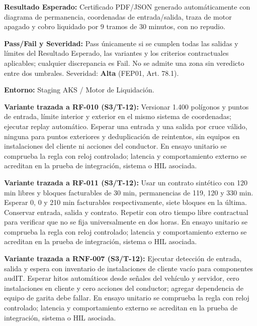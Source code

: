 \par\noindent\textbf{Resultado Esperado:} Certificado PDF/JSON generado automáticamente con diagrama de permanencia, coordenadas de entrada/salida, traza de motor apagado y cobro liquidado por 9 tramos de 30 minutos, con no repudio.\par
\par\noindent\textbf{Pass/Fail y Severidad:} Pass únicamente si se cumplen todas las salidas y límites del Resultado Esperado, las variantes y los criterios contractuales aplicables; cualquier discrepancia es Fail. No se admite una zona sin veredicto entre dos umbrales. Severidad: \textbf{Alta} (FEP01, Art. 78.1).\par
\par\noindent\textbf{Entorno:} Staging AKS / Motor de Liquidación.\par







\par\noindent\textbf{Variante trazada a RF-010 (S3/T-12):} Versionar 1.400 polígonos y puntos de entrada, límite interior y exterior en el mismo sistema de coordenadas; ejecutar replay automático. Esperar una entrada y una salida por cruce válido, ninguna para puntos exteriores y deduplicación de reintentos, sin equipos en instalaciones del cliente ni acciones del conductor. En ensayo unitario se comprueba la regla con reloj controlado; latencia y comportamiento externo se acreditan en la prueba de integración, sistema o HIL asociada.\par

\par\noindent\textbf{Variante trazada a RF-011 (S3/T-12):} Usar un contrato sintético con 120 min libres y bloques facturables de 30 min, permanencias de 119, 120 y 330 min. Esperar 0, 0 y 210 min facturables respectivamente, siete bloques en la última. Conservar entrada, salida y contrato. Repetir con otro tiempo libre contractual para verificar que no se fija universalmente en dos horas. En ensayo unitario se comprueba la regla con reloj controlado; latencia y comportamiento externo se acreditan en la prueba de integración, sistema o HIL asociada.\par

\par\noindent\textbf{Variante trazada a RNF-007 (S3/T-12):} Ejecutar detección de entrada, salida y espera con inventario de instalaciones de cliente vacío para componentes audIT. Esperar hitos automáticos desde señales del vehículo y servidor, cero instalaciones en cliente y cero acciones del conductor; agregar dependencia de equipo de garita debe fallar. En ensayo unitario se comprueba la regla con reloj controlado; latencia y comportamiento externo se acreditan en la prueba de integración, sistema o HIL asociada.\par
